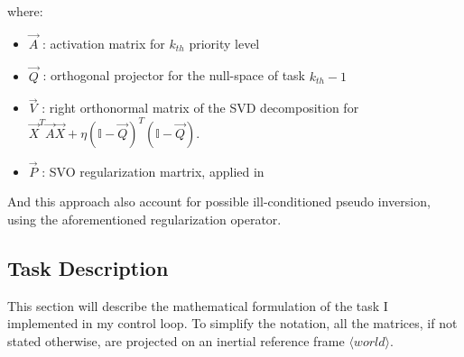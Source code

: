 where:
\begin{itemize}
	\item $\vec{A}$ : activation matrix for $k_{th}$ priority level
	\item $\vec{Q}$ : orthogonal projector for the null-space of task $k_{th}-1$
	\item $\vec{V}$ : right orthonormal matrix of the SVD decomposition for     $\vec{X}^T\vec{A}\vec{X}+\eta(\mathbb{I}-\vec{Q})^T(\mathbb{I}-\vec{Q})$.
	\item $\vec{P}$ : SVO regularization martrix, applied in \cite{nakamura1986inverse} 
\end{itemize}
\noindent And this approach also account for possible ill-conditioned pseudo inversion, using the aforementioned regularization operator.  


\subsection{Task Description}
This section will describe the mathematical formulation of the task I implemented in my control loop. To simplify the notation, all the matrices, if not stated otherwise, are projected on an inertial reference frame $\langle\textit{world}\rangle$.


